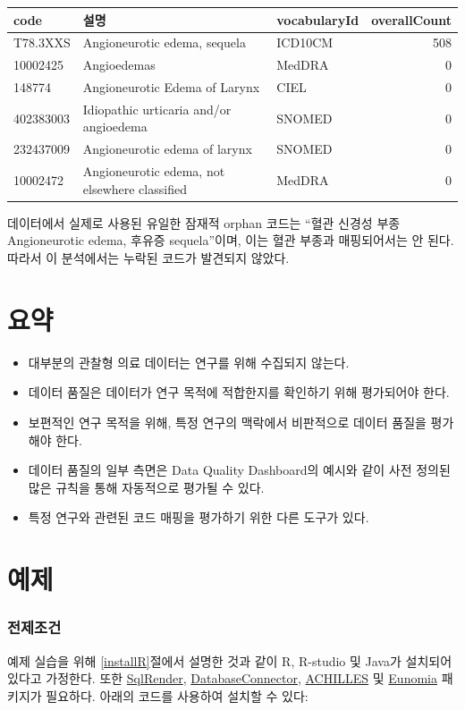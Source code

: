 \documentclass[10.5pt]{book}
\theoremstyle{definition}
\theoremstyle{definition}
\theoremstyle{definition}
\theoremstyle{remark}
\let\BeginKnitrBlock\begin \let\EndKnitrBlock\end
\begin{document}
\begin{longtable}[]{@{}lllr@{}}
\toprule
code & 설명 & vocabularyId & overallCount\tabularnewline
\midrule
\endhead
T78.3XXS & Angioneurotic edema, sequela & ICD10CM & 508\tabularnewline
10002425 & Angioedemas & MedDRA & 0\tabularnewline
148774 & Angioneurotic Edema of Larynx & CIEL & 0\tabularnewline
402383003 & Idiopathic urticaria and/or angioedema & SNOMED &
0\tabularnewline
232437009 & Angioneurotic edema of larynx & SNOMED & 0\tabularnewline
10002472 & Angioneurotic edema, not elsewhere classified & MedDRA &
0\tabularnewline
\bottomrule
\end{longtable}

데이터에서 실제로 사용된 유일한 잠재적 orphan 코드는 ``혈관 신경성 부종
Angioneurotic edema, 후유증 sequela''이며, 이는 혈관 부종과 매핑되어서는
안 된다. 따라서 이 분석에서는 누락된 코드가 발견되지 않았다.

\section{요약}\label{-13}

\BeginKnitrBlock{rmdsummary}
\begin{itemize}
\item
  대부분의 관찰형 의료 데이터는 연구를 위해 수집되지 않는다.
\item
  데이터 품질은 데이터가 연구 목적에 적합한지를 확인하기 위해 평가되어야
  한다.
\item
  보편적인 연구 목적을 위해, 특정 연구의 맥락에서 비판적으로 데이터
  품질을 평가해야 한다.
\item
  데이터 품질의 일부 측면은 Data Quality Dashboard의 예시와 같이 사전
  정의된 많은 규칙을 통해 자동적으로 평가될 수 있다.
\item
  특정 연구와 관련된 코드 매핑을 평가하기 위한 다른 도구가 있다.
\end{itemize}
\EndKnitrBlock{rmdsummary}

\section{예제}\label{-9}

\subsubsection*{전제조건}\label{-7}

예제 실습을 위해 \ref{installR}절에서 설명한 것과 같이 R, R-studio 및
Java가 설치되어 있다고 가정한다. 또한
\href{https://ohdsi.github.io/SqlRender/}{SqlRender},
\href{https://ohdsi.github.io/DatabaseConnector/}{DatabaseConnector},
\href{https://github.com/OHDSI/Achilles}{ACHILLES} 및
\href{https://ohdsi.github.io/Eunomia/}{Eunomia} 패키지가 필요하다.
아래의 코드를 사용하여 설치할 수 있다:
\end{document}
